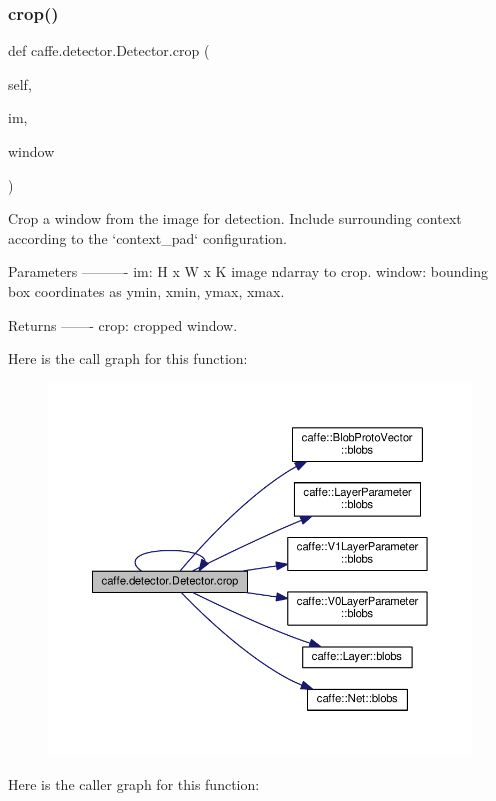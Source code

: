 \subsubsection{\texorpdfstring{crop()}{crop()}\hspace{0.1cm}{\footnotesize\ttfamily [1/2]}}
{\footnotesize\ttfamily def caffe.\+detector.\+Detector.\+crop (\begin{DoxyParamCaption}\item[{}]{self,  }\item[{}]{im,  }\item[{}]{window }\end{DoxyParamCaption})}

\begin{DoxyVerb}Crop a window from the image for detection. Include surrounding context
according to the `context_pad` configuration.

Parameters
----------
im: H x W x K image ndarray to crop.
window: bounding box coordinates as ymin, xmin, ymax, xmax.

Returns
-------
crop: cropped window.
\end{DoxyVerb}
 Here is the call graph for this function\+:
\nopagebreak
\begin{figure}[H]
\begin{center}
\leavevmode
\includegraphics[width=350pt]{classcaffe_1_1detector_1_1_detector_af71bb7e173a228c2e1577b9125310216_cgraph}
\end{center}
\end{figure}
Here is the caller graph for this function\+:
